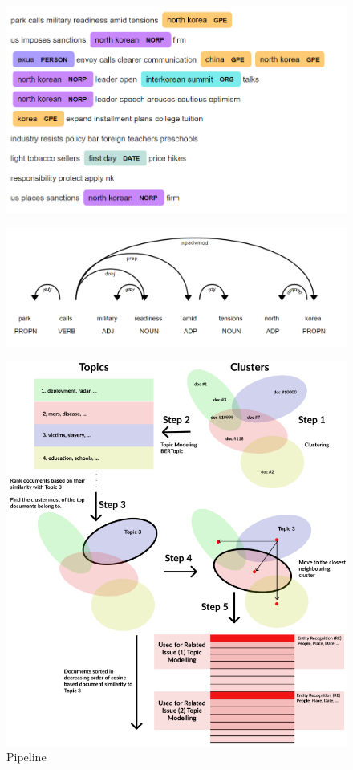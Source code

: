 \documentclass[sigconf,authorversion,nonacm]{acmart}
\begin{document}
\begin{figure}[ht]
    \includegraphics[width=\linewidth]{img/image2.png} 
\end{figure}
\begin{figure}[ht]
    \includegraphics[width=\linewidth]{img/image3.png} 
\end{figure}

\begin{figure}[ht]
    \includegraphics[width=0.8\linewidth]{img/image11.png} 
    \caption{Pipeline}
\end{figure}
\end{document}
